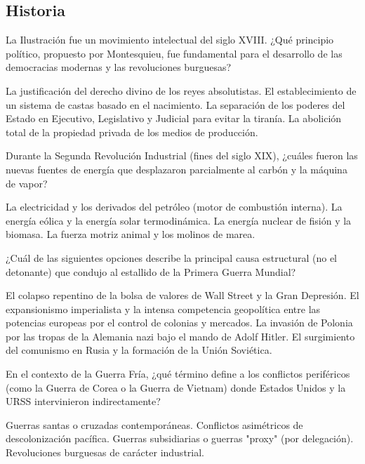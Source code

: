 \documentclass[12pt]{evaluasep}
\begin{document}
\begin{questions}
    \subsection{Historia}

    \question La Ilustración fue un movimiento intelectual del siglo XVIII. ¿Qué principio político, propuesto por Montesquieu, fue fundamental para el desarrollo de las democracias modernas y las revoluciones burguesas?
    \begin{choices}
        \choice La justificación del derecho divino de los reyes absolutistas.
        \choice El establecimiento de un sistema de castas basado en el nacimiento.
        \CorrectChoice La separación de los poderes del Estado en Ejecutivo, Legislativo y Judicial para evitar la tiranía.
        \choice La abolición total de la propiedad privada de los medios de producción.
    \end{choices}
	

    \question Durante la Segunda Revolución Industrial (fines del siglo XIX), ¿cuáles fueron las nuevas fuentes de energía que desplazaron parcialmente al carbón y la máquina de vapor?
    \begin{choices}
        \CorrectChoice La electricidad y los derivados del petróleo (motor de combustión interna).
        \choice La energía eólica y la energía solar termodinámica.
        \choice La energía nuclear de fisión y la biomasa.
        \choice La fuerza motriz animal y los molinos de marea.
    \end{choices}
	

    \question ¿Cuál de las siguientes opciones describe la principal causa estructural (no el detonante) que condujo al estallido de la Primera Guerra Mundial?
    \begin{choices}
        \choice El colapso repentino de la bolsa de valores de Wall Street y la Gran Depresión.
        \CorrectChoice El expansionismo imperialista y la intensa competencia geopolítica entre las potencias europeas por el control de colonias y mercados.
        \choice La invasión de Polonia por las tropas de la Alemania nazi bajo el mando de Adolf Hitler.
        \choice El surgimiento del comunismo en Rusia y la formación de la Unión Soviética.
    \end{choices}
	

    \question En el contexto de la Guerra Fría, ¿qué término define a los conflictos periféricos (como la Guerra de Corea o la Guerra de Vietnam) donde Estados Unidos y la URSS intervinieron indirectamente?
    \begin{choices}
        \choice Guerras santas o cruzadas contemporáneas.
        \choice Conflictos asimétricos de descolonización pacífica.
        \CorrectChoice Guerras subsidiarias o guerras "proxy" (por delegación).
        \choice Revoluciones burguesas de carácter industrial.
    \end{choices}
	


\end{questions}
\end{document}
